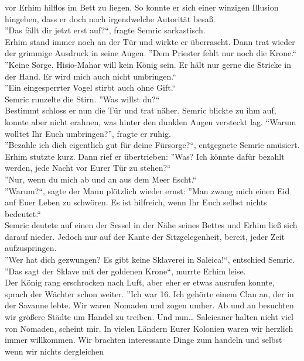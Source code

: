 vor Erhim hilflos im Bett zu liegen. So konnte er sich einer winzigen Illusion hingeben, dass er 
doch noch irgendwelche Autorität besaß. \\
''Das fällt dir jetzt erst auf?``, fragte Semric sarkastisch.\\
Erhim stand immer noch an der Tür und wirkte er überrascht. Dann trat wieder der grimmige 
Ausdruck in seine Augen. ''Dem Priester fehlt nur noch die Krone.``\\
''Keine Sorge. Hisio-Mahar will kein König sein. Er hält nur gerne die Stricke in der Hand. Er wird 
mich auch nicht umbringen.``\\
''Ein eingesperrter Vogel stirbt auch ohne Gift.``\\
Semric runzelte die Stirn. ''Was willst du?``\\
Bestimmt schloss er nun die Tür und trat näher. Semric blickte zu ihm auf, konnte aber nicht 
erahnen, was hinter den dunklen Augen versteckt lag. ``Warum wolltet Ihr Euch umbringen?'', 
fragte er ruhig.\\
''Bezahle ich dich eigentlich gut für deine Fürsorge?``, entgegnete Semric amüsiert.\\
Erhim stutzte kurz. Dann rief er übertrieben: ''Was? Ich könnte dafür bezahlt werden, jede Nacht 
vor 
Eurer Tür zu stehen?``\\
''Nur, wenn du mich ab und an aus dem Meer fischt.``\\
''Warum?``, sagte der Mann plötzlich wieder ernst: ''Man zwang mich einen Eid auf Euer Leben zu 
schwören. Es ist hilfreich, wenn Ihr Euch selbst nichts bedeutet.``\\
Semric deutete auf einen der Sessel in der Nähe seines Bettes und Erhim ließ sich darauf nieder. 
Jedoch nur auf der Kante der Sitzgelegenheit, bereit, jeder Zeit aufzuspringen.\\
''Wer hat dich gezwungen? Es gibt keine Sklaverei in Saleica!``, entschied Semric.\\
''Das sagt der Sklave mit der goldenen Krone``, murrte Erhim leise.\\
Der König rang erschrocken nach Luft, aber eher er etwas ausrufen konnte, sprach der Wächter schon 
weiter. ''Ich war 16. Ich gehörte einem Clan an, der in der Savanne lebte. Wir waren Nomaden und 
zogen umher. Ab und an besuchten wir größere Städte um Handel zu treiben. Und nun… Saleicaner 
halten 
nicht viel von Nomaden, scheint mir. In vielen Ländern Eurer Kolonien waren wir herzlich immer
willkommen. Wir brachten interessante Dinge zum handeln und selbst wenn wir nichts dergleichen 
